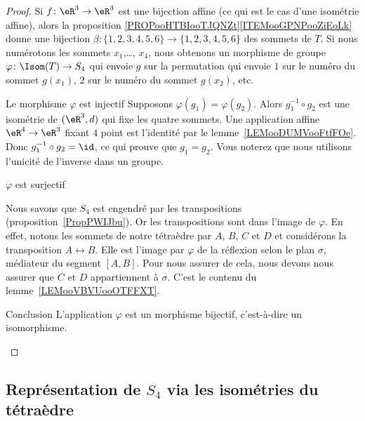 \begin{proof}
	Si \( f\colon \eR^3\to \eR^3\) est une bijection affine (ce qui est le cas d'une isométrie affine), alors la proposition \ref{PROPooHTBIooTJQNZt}\ref{ITEMooGPNPooZiEoLk} donne une bijection \( \beta\colon \{ 1,2,3,4,5,6 \}\to \{ 1,2,3,4,5,6 \}\) des sommets de \( T\). Si nous numérotons les sommets \( x_1\),\ldots, \( x_4\), nous obtenons un morphisme de groupe \( \varphi\colon \Isom(T) \to S_4\) qui envoie \( g\) sur la permutation qui envoie \( 1\) sur le numéro du sommet \( g(x_1)\), \( 2\) sur le numéro du sommet \( g(x_2)\), etc.

	\begin{subproof}
		\item[Le morphisme \( \varphi\) est injectif]
		Supposons \( \varphi(g_1)=\varphi(g_2)\). Alors \( g_1^{-1}\circ g_2\) est une isométrie de \( (\eR^3,d)\) qui fixe les quatre sommets. Une application affine \( \eR^4\to\eR^3\) fixant \( 4\) point est l'identité par le lemme~\ref{LEMooDUMVooFtfFOe}. Donc \( g_1^{-1}\circ g_2=\id\), ce qui prouve que \( g_1=g_2\). Vous noterez que nous utilisons l'unicité de l'inverse dans un groupe.

		\item[\( \varphi\) est surjectif]

		Nous savons que \( S_4\) est engendré par les transpositions (proposition~\ref{PropPWIJbu}). Or les transpositions sont dans l'image de \( \varphi\). En effet, notons les sommets de notre tétraèdre par \( A\), \( B\), \( C\) et \( D\) et considérons la transposition \( A\leftrightarrow B\). Elle est l'image par \( \varphi\) de la réflexion selon le plan \( \sigma\), médiateur du segment \( [A,B]\). Pour nous assurer de cela, nous devons nous assurer que \( C\) et \( D\) appartiennent à \( \sigma\). C'est le contenu du lemme~\ref{LEMooVBVUooOTFFXT}.

		\item[Conclusion]
		L'application \( \varphi\) est un morphisme bijectif, c'est-à-dire un isomorphisme.

	\end{subproof}
\end{proof}

\subsection{Représentation de \( S_4\) via les isométries du tétraèdre}
\label{SUBSECooVEASooDUbsBh}


